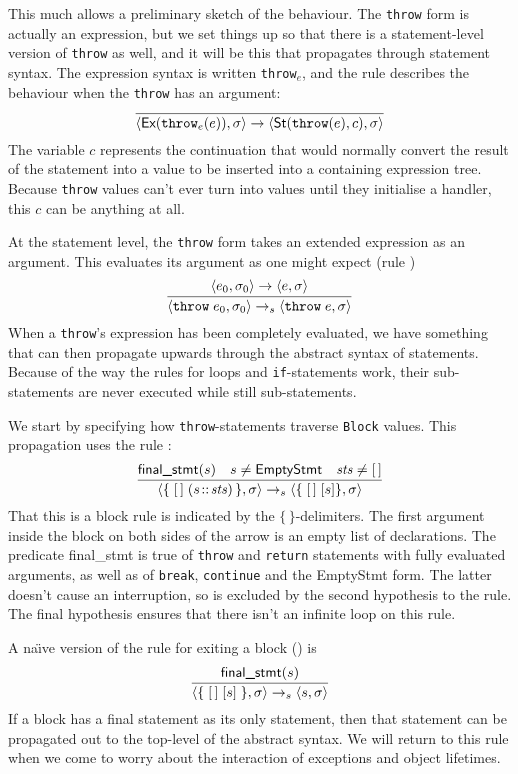 \documentclass[11pt]{article}
\newcommand{\naive}{na\"\i{}ve}
\begin{document}
\newcommand{\ethrow}{\texttt{throw}\ensuremath{_e}}
This much allows a preliminary sketch of the behaviour.  The
\texttt{throw} form is actually an expression, but we set things up so
that there is a statement-level version of \texttt{throw} as well, and
it will be this that propagates through statement syntax.  The
expression syntax is written \ethrow{}, and the rule
 describes the behaviour when the
\texttt{throw} has an argument:
\[
\infer{
  \statebrack{\textsf{Ex}(\ethrow(e)), \sigma}
  \to
  \statebrack{\textsf{St}(\texttt{throw}(e),c), \sigma}}{}
\]
The variable $c$ represents the continuation that would normally
convert the result of the statement into a value to be inserted into a
containing expression tree.  Because \texttt{throw} values can't ever
turn into values until they initialise a handler, this $c$ can be
anything at all.

At the statement level, the \texttt{throw} form takes an extended
expression as an argument.  This evaluates its argument as one might
expect (rule )
\[
\infer{\statebrack{\texttt{throw}\;e_0,\sigma_0}\stmtarrow\statebrack{\texttt{throw}\;e,\sigma}}{\statebrack{e_0,\sigma_0}\to\statebrack{e,\sigma}}
\]
When a \texttt{throw}'s expression has been completely evaluated, we
have something that can then propagate upwards through the abstract
syntax of statements.  Because of the way the rules for loops and
\texttt{if}-statements work, their sub-statements are never executed
while still sub-statements.

We start by specifying how \texttt{throw}-statements traverse
\texttt{Block} values.  This propagation uses the rule
:
\[
\infer{
  \statebrack{
    \mathbf{\{} \;[\,] \;(s\!::\!\mathit{sts})\,\mathbf{\}},
    \sigma
  }
  \stmtarrow
  \statebrack{\mathbf{\{} \;[\,]\; [s]\mathbf{\}},\sigma}}{
  \textsf{final\_stmt}(s) & s \neq \textsf{EmptyStmt} & \mathit{sts}
  \neq [\,]}
\]
That this is a block rule is indicated by the
$\mathbf{\{\,\}}$-delimiters.  The first argument inside the block on
both sides of the arrow is an empty list of declarations.  The
predicate \textsf{final\_stmt} is true of \texttt{throw} and
\texttt{return} statements with fully evaluated arguments, as well as
of \texttt{break}, \texttt{continue} and the \textsf{EmptyStmt} form.
The latter doesn't cause an interruption, so is excluded by the second
hypothesis to the rule.  The final hypothesis ensures that there isn't
an infinite loop on this rule.

A \naive{} version of the rule for exiting a block
() is
\[
\infer{
  \statebrack{\mathbf{\{}\;[\,]\;[s]\;\mathbf{\}},\sigma}
  \stmtarrow
  \statebrack{s,\sigma}
}{
  \textsf{final\_stmt}(s)
}
\]
If a block has a final statement as its only statement, then that
statement can be propagated out to the top-level of the abstract
syntax. We will return to this rule when we come to worry about the
interaction of exceptions and object lifetimes.
\end{document}

